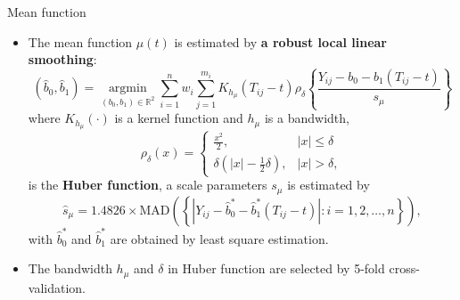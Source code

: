 \documentclass[9pt]{beamer}
\begin{document}
\begin{frame}[allowframebreaks]{Mean function}
	\begin{itemize}
		\item{
			The mean function $\mu(t)$ is estimated by \textbf{a robust local linear smoothing}: 
			$$
			( \hat b_0 , \hat b_1) = \underset{(b_0,b_1) \in \mathbb{R}^2}{\operatorname{\arg\min}} \sum_{i=1}^n w_i \sum_{j=1}^{m_i} K_{h_\mu} (T_{ij} -t) 
			\rho_\delta  \left\{ \frac {Y_{ij} - b_0 - b_1 (T_{ij} -t) }{s_{\mu}} \right\}
			$$
			where $K_{h_\mu}(\cdot)$ is a kernel function and $h_{\mu}$ is a bandwidth,
			$$ \rho_\delta (x) = \begin{cases} \frac{x^2}{2} , & |x| \leq \delta \\
			\delta \left( |x| - \frac{1}{2} \delta \right) , & |x| > \delta ,
			\end{cases}
			$$
			is the \textbf{Huber function}, a scale parameters $s_\mu$ is estimated by 
			$$ \hat s_{\mu} = 1.4826 \times \text{MAD}\left( \left\{ |Y_{ij} - \hat{b}_0^{*} - \hat{b}_1^{*} (T_{ij} -t)| : i=1,2,\dots,n \right\} \right) , $$
			with $\hat{b}_0^{*}$ and $\hat{b}_1^{*}$ are obtained by least square estimation.
		}
		\item{
			The bandwidth $h_{\mu}$ and $\delta$ in Huber function are selected by 5-fold cross-validation.
		}
	\end{itemize}
\end{frame}
\end{document}
